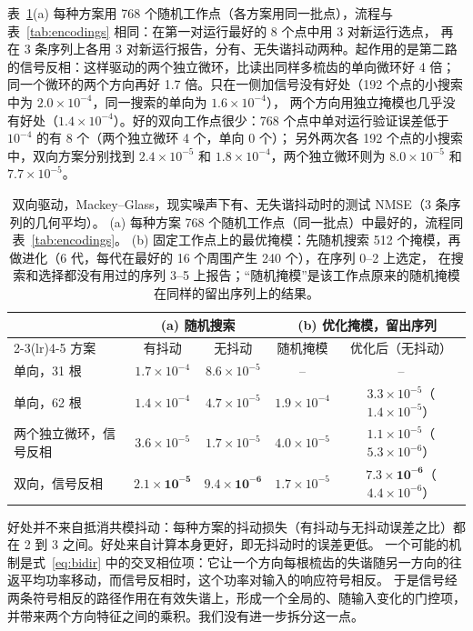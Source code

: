 表~\ref{tab:bidir}(a) 每种方案用 768 个随机工作点（各方案用同一批点），流程与表~\ref{tab:encodings} 相同：在第一对运行最好的 8 个点中用 3 对新运行选点，
再在 3 条序列上各用 3 对新运行报告，分有、无失谐抖动两种。起作用的是第二路的信号反相：这样驱动的两个独立微环，比读出同样多梳齿的单向微环好 4 倍；
同一个微环的两个方向再好 1.7 倍。只在一侧加信号没有好处（192 个点的小搜索中为 $2.0\times10^{-4}$，同一搜索的单向为 $1.6\times10^{-4}$），
两个方向用独立掩模也几乎没有好处（$1.4\times10^{-4}$）。好的双向工作点很少：768 个点中单对运行验证误差低于 $10^{-4}$ 的有 8 个（两个独立微环 4 个，单向 0 个）；
另外两次各 192 个点的小搜索中，双向方案分别找到 $2.4\times10^{-5}$ 和 $1.8\times10^{-4}$，两个独立微环则为 $8.0\times10^{-5}$ 和 $7.7\times10^{-5}$。

\begin{table}[htbp]
\centering
\caption{双向驱动，Mackey--Glass，现实噪声下有、无失谐抖动时的测试 NMSE（3 条序列的几何平均）。
(a) 每种方案 768 个随机工作点（同一批点）中最好的，流程同表~\ref{tab:encodings}。
(b) 固定工作点上的最优掩模：先随机搜索 512 个掩模，再做进化（6 代，每代在最好的 16 个周围产生 240 个），在序列 0--2 上选定，
在搜索和选择都没有用过的序列 3--5 上报告；“随机掩模”是该工作点原来的随机掩模在同样的留出序列上的结果。}
\label{tab:bidir}
\small\setlength{\tabcolsep}{4pt}
\begin{tabular}{lcccc}
\toprule
 & \multicolumn{2}{c}{(a) 随机搜索} & \multicolumn{2}{c}{(b) 优化掩模，留出序列} \\
\cmidrule(lr){2-3}\cmidrule(lr){4-5}
方案 & 有抖动 & 无抖动 & 随机掩模 & 优化后（无抖动） \\
\midrule
单向，31 根 & $1.7\times10^{-4}$ & $8.6\times10^{-5}$ & -- & -- \\
单向，62 根 & $1.4\times10^{-4}$ & $4.7\times10^{-5}$ & $1.9\times10^{-4}$ & $3.3\times10^{-5}$（$1.4\times10^{-5}$） \\
两个独立微环，信号反相 & $3.6\times10^{-5}$ & $1.7\times10^{-5}$ & $4.0\times10^{-5}$ & $1.1\times10^{-5}$（$5.3\times10^{-6}$） \\
双向，信号反相 & $\mathbf{2.1\times10^{-5}}$ & $\mathbf{9.4\times10^{-6}}$ & $1.7\times10^{-5}$ & $\mathbf{7.3\times10^{-6}}$（$4.4\times10^{-6}$） \\
\bottomrule
\end{tabular}
\end{table}

好处并不来自抵消共模抖动：每种方案的抖动损失（有抖动与无抖动误差之比）都在 2 到 3 之间。好处来自计算本身更好，即无抖动时的误差更低。
一个可能的机制是式~\eqref{eq:bidir} 中的交叉相位项：它让一个方向每根梳齿的失谐随另一方向的往返平均功率移动，而信号反相时，这个功率对输入的响应符号相反。
于是信号经两条符号相反的路径作用在有效失谐上，形成一个全局的、随输入变化的门控项，并带来两个方向特征之间的乘积。我们没有进一步拆分这一点。

